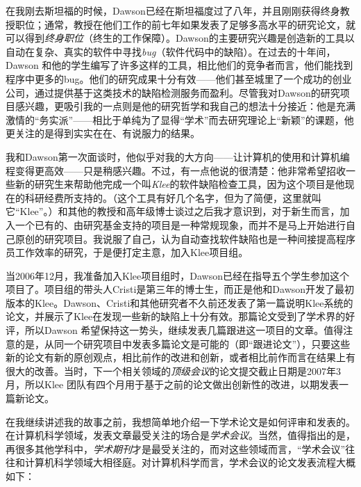 \documentclass[12pt,UTF8,nofonts]{book}
\begin{document}
在我刚去斯坦福的时候，Dawson已经在斯坦福度过了八年，并且刚刚获得终身教授职位；通常，教授在他们工作的前七年如果发表了足够多高水平的研究论文，就可以得到\emph{终身职位}（终生的工作保障）。Dawson的主要研究兴趣是创造新的工具以自动在复杂、真实的软件中寻找\emph{bug}（软件代码中的缺陷）。在过去的十年间，Dawson 和他的学生编写了许多这样的工具，相比他们的竞争者而言，他们能找到程序中更多的bug。他们的研究成果十分有效——他们甚至城里了一个成功的创业公司，通过提供基于这类技术的缺陷检测服务而盈利。尽管我对Dawson的研究项目感兴趣，更吸引我的一点则是他的研究哲学和我自己的想法十分接近：他是充满激情的“务实派”——相比于单纯为了显得“学术”而去研究理论上“新颖”的课题，他更关注的是得到实实在在、有说服力的结果。

我和Dawson第一次面谈时，他似乎对我的大方向——让计算机的使用和计算机编程变得更高效——只是稍感兴趣。不过，有一点他说的很清楚：他非常希望招收一些新的研究生来帮助他完成一个叫\emph{Klee}的软件缺陷检查工具，因为这个项目是他现在的科研经费所支持的。（这个工具有好几个名字，但为了简便，这里就叫它“Klee”。）和其他的教授和高年级博士谈过之后我才意识到，对于新生而言，加入一个已有的、由研究基金支持的项目是一种常规现象，而并不是马上开始进行自己原创的研究项目。我说服了自己，认为自动查找软件缺陷也是一种间接提高程序员工作效率的研究，于是便打定主意，加入Klee项目组。

当2006年12月，我准备加入Klee项目组时，Dawson已经在指导五个学生参加这个项目了。项目组的带头人Cristi是第三年的博士生，而正是他和Dawson开发了最初版本的Klee。Dawson、Cristi和其他研究者不久前还发表了第一篇说明Klee系统的论文，并展示了Klee在发现一些新的缺陷上十分有效。那篇论文受到了学术界的好评，所以Dawson 希望保持这一势头，继续发表几篇跟进这一项目的文章。值得注意的是，从同一个研究项目中发表多篇论文是可能的（即“跟进论文”），只要这些新的论文有新的原创观点，相比前作的改进和创新，或者相比前作而言在结果上有很大的改善。当时，下一个相关领域的\emph{顶级会议}的论文提交截止日期是2007年3月，所以Klee 团队有四个月用于基于之前的论文做出创新性的改进，以期发表一篇新论文。

\breakline

在我继续讲述我的故事之前，我想简单地介绍一下学术论文是如何评审和发表的。在计算机科学领域，发表文章最受关注的场合是\emph{学术会议}。当然，值得指出的是，再很多其他学科中，\emph{学术期刊}才是最受关注的，而对这些领域而言，“学术会议”往往和计算机科学领域大相径庭。对计算机科学而言，学术会议的论文发表流程大概如下：
\end{document}
